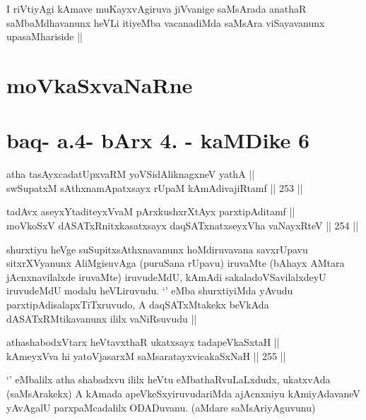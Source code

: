 \begin{artha}
I riVtiyAgi kAmave muKayxvAgiruva jiVvanige saMsArada anathaR
saMbaMdhavanunx heVLi itiyeMba vacanadiMda saMsAra viSayavanunx
upasaMhariside ||
\end{artha}

\section*{moVkaSxvaNaRne}

\section*{baq- a.4- bArx 4. - kaMDike 6}

\stext


\begin{shl}
atha tasAyxcadatUpxvaRM yoVSidAliknagxneV yathA || \\
swSupatxM sAthxnamApatxsayx rUpaM kAmAdivajiRtamf ||  253 ||  
\end{shl}
				
\begin{shl}
tadAvx aseyxYtaditeyxVvaM pArxkushxrXtAyx parxtipAditamf || \\
moVkoSxV dASATxRnitxkasatxsayx daqSATxnatxseyxVha vaNayxRteV ||  254 ||   
\end{shl}

\begin{artha}
shurxtiyu heVge suSupitxsAthxnavanunx hoMdiruvavana savxrUpavu
sitxrXVyanunx AliMgisuvAga (puruSana rUpavu) iruvaMte (bAhayx AMtara
jAcnxnavilalxde iruvaMte) iruvudeMdU, kAmAdi sakaladoVSavilalxdeyU
iruvudeMdU modalu heVLiruvudu. `\stext' eMba shurxtiyiMda yAvudu
parxtipAdisalapxTiTxruvudo, A daqSATxMtakekx beVkAda
dASATxRMtikavanunx ililx vaNiRsuvudu ||
\end{artha}

\begin{shl}
athashabodxV\s tarx heVtavxthaR ukatxsayx tadapeVkaSxtaH || \\
kAmeyxVva hi yatoV\s jasarxM saMsaratayxvicakaSxNaH ||  255 ||  
\end{shl}

\begin{artha}
`\stext' eMbalilx atha shabadxvu ililx heVtu eMbathaRvuLaLxdudx,
  ukatxvAda (saMsArakekx) A kAmada apeVkeSxyiruvudariMda ajAcnxniyu
  kAmiyAdavaneV yAvAgalU parxpaMcadalilx ODADuvanu. (aMdare saMsAriyAguvunu)
\end{artha}

